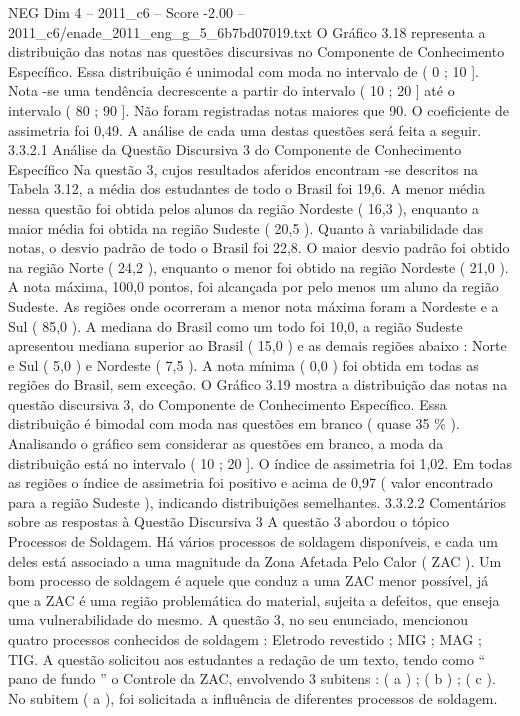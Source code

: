 \begin{textsample}{NEG Dim 4 – 2011\_c6 – Score -2.00 – 2011\_c6/enade\_2011\_eng\_g\_5\_6b7bd07019.txt}
O Gráfico 3.18 representa a distribuição das notas nas questões discursivas no Componente de Conhecimento Específico.
Essa distribuição é unimodal com moda no intervalo de ( 0 ; 10 ].
Nota -se uma tendência decrescente a partir do intervalo ( 10 ; 20 ] até o intervalo ( 80 ; 90 ].
Não foram registradas notas maiores que 90.
O coeficiente de assimetria foi 0,49.
A análise de cada uma destas questões será feita a seguir. 3.3.2.1 Análise da Questão Discursiva 3 do Componente de Conhecimento Específico Na questão 3, cujos resultados aferidos encontram -se descritos na Tabela 3.12, a média dos estudantes de todo o Brasil foi 19,6.
A menor média nessa questão foi obtida pelos alunos da região Nordeste ( 16,3 ), enquanto a maior média foi obtida na região Sudeste ( 20,5 ).
Quanto à variabilidade das notas, o desvio padrão de todo o Brasil foi 22,8.
O maior desvio padrão foi obtido na região Norte ( 24,2 ), enquanto o menor foi obtido na região Nordeste ( 21,0 ).
A nota máxima, 100,0 pontos, foi alcançada por pelo menos um aluno da região Sudeste.
As regiões onde ocorreram a menor nota máxima foram a Nordeste e a Sul ( 85,0 ).
A mediana do Brasil como um todo foi 10,0, a região Sudeste apresentou mediana superior ao Brasil ( 15,0 ) e as demais regiões abaixo : Norte e Sul ( 5,0 ) e Nordeste ( 7,5 ).
A nota mínima ( 0,0 ) foi obtida em todas as regiões do Brasil, sem exceção.
O Gráfico 3.19 mostra a distribuição das notas na questão discursiva 3, do Componente de Conhecimento Específico.
Essa distribuição é bimodal com moda nas questões em branco ( quase 35 \% ).
Analisando o gráfico sem considerar as questões em branco, a moda da distribuição está no intervalo ( 10 ; 20 ].
O índice de assimetria foi 1,02.
Em todas as regiões o índice de assimetria foi positivo e acima de 0,97 ( valor encontrado para a região Sudeste ), indicando distribuições semelhantes. 3.3.2.2 Comentários sobre as respostas à Questão Discursiva 3 A questão 3 abordou o tópico Processos de Soldagem.
Há vários processos de soldagem disponíveis, e cada um deles está associado a uma magnitude da Zona Afetada Pelo Calor ( ZAC ).
Um bom processo de soldagem é aquele que conduz a uma ZAC menor possível, já que a ZAC é uma região problemática do material, sujeita a defeitos, que enseja uma vulnerabilidade do mesmo.
A questão 3, no seu enunciado, mencionou quatro processos conhecidos de soldagem : Eletrodo revestido ; MIG ; MAG ; TIG.
A questão solicitou aos estudantes a redação de um texto, tendo como “ pano de fundo ” o Controle da ZAC, envolvendo 3 subitens : ( a ) ; ( b ) ; ( c ).
No subitem ( a ), foi solicitada a influência de diferentes processos de soldagem.

\end{textsample}
